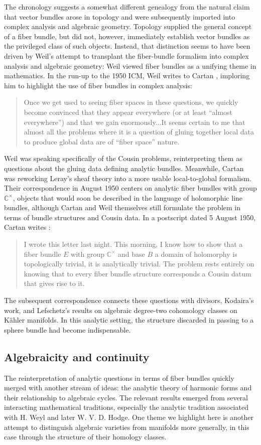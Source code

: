 \documentclass[11pt,leqno]{article}
\newcommand{\cplx}{{\mathbb C}}
\renewcommand{\1}{{\rm 1\hspace*{-0.4ex}%
\rule{0.1ex}{1.52ex}\hspace*{0.2ex}}}
\newcommand{\<}[1]{{\langle}#1 {\rangle}}
\theoremstyle{plain}
\theoremstyle{definition}
\theoremstyle{remark}
\numberwithin{equation}{subsection}
\begin{document}
The chronology suggests a somewhat different genealogy from the natural claim that vector bundles arose in topology and were subsequently imported into complex analysis and algebraic geometry. Topology supplied the general concept of a fiber bundle, but did not, however, immediately establish vector bundles as the privileged class of such objects.  Instead, that distinction seems to have been driven by Weil’s attempt to transplant the fiber-bundle formalism into complex analysis and algebraic geometry: Weil viewed fiber bundles as a unifying theme in mathematics.  In the run-up to the 1950 ICM, Weil writes to Cartan \cite[p. 312]{CartanWeil}, imploring him to highlight the use of fiber bundles in complex analysis:  
\begin{quote}
	Once we get used to seeing fiber spaces in these questions, we quickly become convinced that they appear everywhere (or at least ``almost everywhere'') and that we gain enormously...It seems certain to me that almost all the problems where it is a question of gluing together local data to produce global data are of ``fiber space'' nature.
\end{quote}
Weil was speaking specifically of the Cousin problems, reinterpreting them as questions about the gluing data defining analytic bundles. Meanwhile, Cartan was reworking Leray's sheaf theory into a more usable local-to-global formalism. Their correspondence in August 1950 centers on analytic fiber bundles with group $\cplx^\times$, objects that would soon be described in the language of holomorphic line bundles, although Cartan and Weil themselves still formulate the problem in terms of bundle structures and Cousin data. In a postscript dated 5 August 1950, Cartan writes \cite[p.~315]{CartanWeil}:
\begin{quote}
	I wrote this letter last night.  This morning, I know how to show that a fiber bundle $E$ with group $\cplx^{\times}$ and base $B$ a domain of holomorphy is topologically trivial, it is analytically trivial.  The problem rests entirely on knowing that to every fiber bundle structure corresponds a Cousin datum that gives rise to it.
\end{quote}
The subsequent correspondence connects these questions with divisors, Kodaira's work, and Lefschetz's results on algebraic degree-two cohomology classes on K\"ahler manifolds. In this analytic setting, the structure discarded in passing to a sphere bundle had become indispensable.

\subsection{Algebraicity and continuity}
\label{ss:algvscont}
The reinterpretation of analytic questions in terms of fiber bundles quickly merged with another stream of ideas: the analytic theory of harmonic forms and their relationship to algebraic cycles. The relevant results emerged from several interacting mathematical traditions, especially the analytic tradition associated with H. Weyl and later W. V. D. Hodge.  One theme we highlight here is another attempt to distinguish algebraic varieties from manifolds more generally, in this case through the structure of their homology classes.
\end{document}
